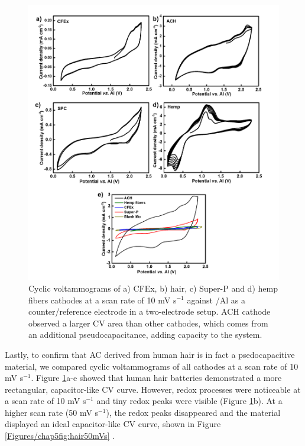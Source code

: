  \begin{figure}[h!]
  \centering
  \includegraphics[width=\textwidth]{Figures/chap5fig/CV}
    \caption{Cyclic voltammograms of a) CFEx, b) hair, c) Super-P and d) hemp fibers cathodes at a scan rate of 10 mV s$^{-1}$ against /Al as a counter/reference electrode in a two-electrode setup. ACH cathode observed a larger CV area than other cathodes, which comes from an additional pseudocapacitance, adding capacity to the system.}
  \label{Figures/chap5fig:CV}
\end{figure}

Lastly, to confirm that AC derived from human hair is in fact a psedocapacitive material, we compared cyclic voltammograms of all cathodes at a scan rate of 10 mV s$^{-1}$. Figure \ref{Figures/chap5fig:CV}a-e showed that human hair batteries demonstrated a more rectangular, capacitor-like CV curve. However, redox processes were noticeable at a scan rate of 10 mV s$^{-1}$ and tiny redox peaks were visible (Figure \ref{Figures/chap5fig:CV}b). At a higher scan rate (50 mV s$^{-1}$), the redox peaks disappeared and the material displayed an ideal capacitor-like CV curve, shown in Figure \ref{Figures/chap5fig:hair50mVs} \cite{guan_capacitive_2016, dupont_separating_2015}. 


